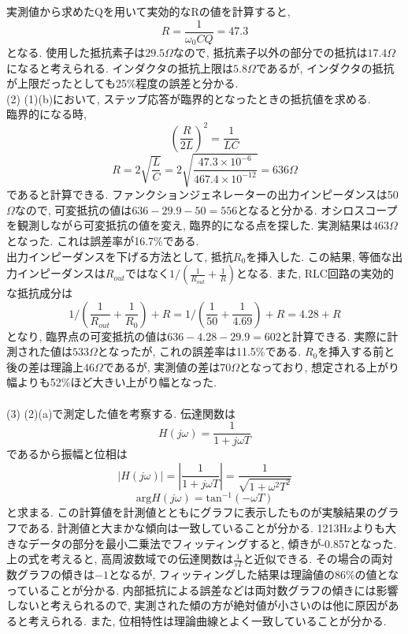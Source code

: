 \documentclass[a4j,dvipdfmx]{article}
\begin{document}
実測値から求めたQを用いて実効的なRの値を計算すると, $$R = \frac{1}{\omega_0 C Q} = 47.3$$となる. 使用した抵抗素子は$29.5\Omega$なので, 抵抗素子以外の部分での抵抗は$17.4\Omega$になると考えられる. インダクタの抵抗上限は$5.8\Omega$であるが, インダクタの抵抗が上限だったとしても25\%程度の誤差と分かる. \\

(2) (1)(b)において, ステップ応答が臨界的となったときの抵抗値を求める. \\
臨界的になる時, 
$$
\left(\frac{R}{2L}\right)^2 = \frac{1}{LC}
$$
$$
R = 2\sqrt{\frac{L}{C}} = 2\sqrt{\frac{47.3 \times 10^{-6}}{467.4 \times 10^{-12}}} = 636\Omega
$$
であると計算できる. ファンクションジェネレーターの出力インピーダンスは50$\Omega$なので, 可変抵抗の値は$636-29.9-50=556$となると分かる. オシロスコープを観測しながら可変抵抗の値を変え, 臨界的になる点を探した. 実測結果は$463\Omega$となった. これは誤差率が16.7\%である. \\

出力インピーダンスを下げる方法として, 抵抗$R_0$を挿入した. この結果, 等価な出力インピーダンスは$R_{out}$ではなく$1/(\frac{1}{R_{out}}+\frac{1}{R})$となる. また, RLC回路の実効的な抵抗成分は
$$
1/\left(\frac{1}{R_{out}}+\frac{1}{R_0}\right) + R = 1/\left(\frac{1}{50} + \frac{1}{4.69}\right) +R = 4.28 + R
$$
となり, 臨界点の可変抵抗の値は$636- 4.28 - 29.9 = 602$と計算できる. 実際に計測された値は$533\Omega$となったが, これの誤差率は11.5\%である. $R_0$を挿入する前と後の差は理論上$46\Omega$であるが, 実測値の差は$70\Omega$となっており, 想定される上がり幅よりも52\%ほど大きい上がり幅となった. \\~\\


(3) (2)(a)で測定した値を考察する. 伝達関数は
$$
H(j\omega) = \frac{1}{1+j\omega T}
$$
であるから振幅と位相は
$$
|H(j\omega)| = \left|\frac{1}{1+j\omega T}\right| = \frac{1}{\sqrt{1+\omega^2T^2}}
$$
$$
\mbox{arg} H(j\omega) = \mbox{tan}^{-1}(-\omega T)
$$
と求まる. この計算値を計測値とともにグラフに表示したものが実験結果のグラフである. 計測値と大まかな傾向は一致していることが分かる. 
1213Hzよりも大きなデータの部分を最小二乗法でフィッティングすると, 傾きが-0.857となった. 上の式を考えると, 高周波数域での伝達関数は$\frac{1}{sT}$と近似できる. その場合の両対数グラフの傾きは$-1$となるが, フィッティングした結果は理論値の86\%の値となっていることが分かる. 内部抵抗による誤差などは両対数グラフの傾きには影響しないと考えられるので, 実測された傾の方が絶対値が小さいのは他に原因があると考えられる. また, 位相特性は理論曲線とよく一致していることが分かる. \\~\\
\end{document}
